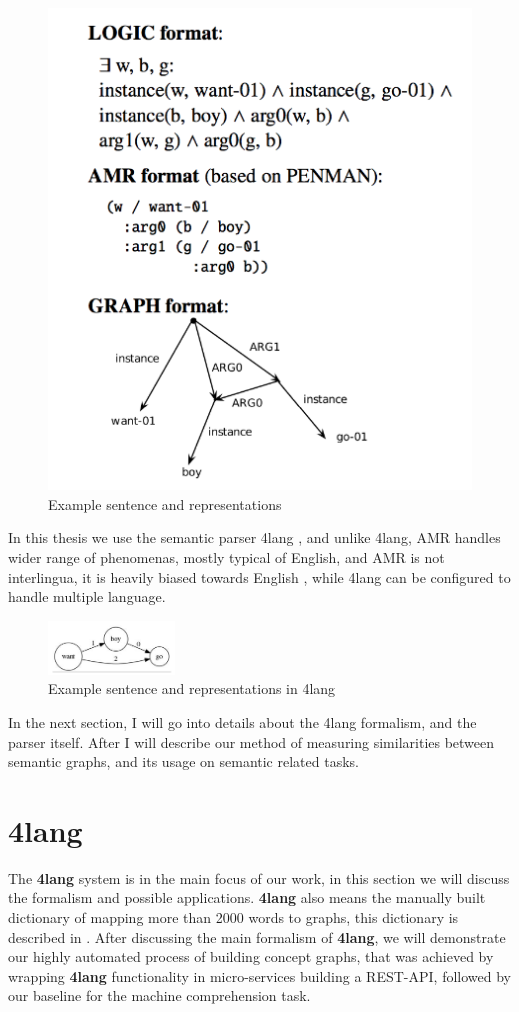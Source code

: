 \begin{figure}[h!]
	\centering
	\includegraphics[height=0.4\textwidth]{figures/amr}
	\caption{Example sentence and representations}
	\label{fig:amr}
\end{figure}

In this thesis we use the semantic parser 4lang \cite{Recski:2015b}, and unlike 4lang, AMR handles wider range of phenomenas, mostly typical of English, and AMR is not interlingua, it is heavily biased towards English \cite{Palmer:2005}, while 4lang can be configured to handle multiple language.

\begin{figure}[h!]
	\centering
	\includegraphics[width=0.3\textwidth]{figures/4langboy}
	\caption{Example sentence and representations in 4lang}
	\label{fig:4langboy}
\end{figure}

In the next section, I will go into details about the 4lang formalism, and the parser itself. After I will describe our method of measuring similarities between semantic graphs, and its usage on semantic related tasks.

\section{4lang}
\label{sec:4lang}
The \textbf{4lang} system is in the main focus of our work, in this section we will discuss the formalism and possible applications. \textbf{4lang} also means the manually built dictionary of mapping more than 2000 words to graphs, this dictionary is described in \cite{Kornai:2013}. After discussing the main formalism of \textbf{4lang}, we will demonstrate our highly automated process of building concept graphs, that was achieved by wrapping \textbf{4lang} functionality in micro-services building a REST-API, followed by our baseline for the machine comprehension task.

